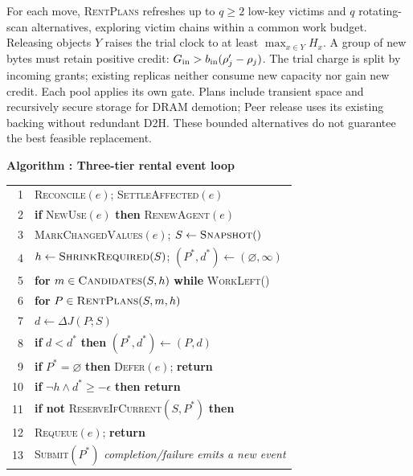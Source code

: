 For each move, \textsc{RentPlans} refreshes up to $q\ge2$ low-key victims
and $q$ rotating-scan alternatives, exploring victim chains within a common
work budget. Releasing objects $Y$ raises the trial clock to at least
$\max_{x\in Y}H_x$. A group of new bytes must retain positive credit:
$G_{\rm in}>b_{\rm in}(\rho'_j-\rho_j)$. The trial charge is split by
incoming grants; existing replicas neither consume new capacity nor gain
new credit. Each pool applies its own gate. Plans include transient space
and recursively secure storage for DRAM demotion; Peer release uses its
existing backing without redundant D2H. These bounded alternatives do
not guarantee the best feasible replacement.

\par\medskip\noindent\begin{minipage}{\columnwidth}
\raggedright
 \label{alg:placement}
 \textbf{Algorithm \thedesignalgorithm: Three-tier rental event loop}
 \par\smallskip
 \begin{tabularx}{\columnwidth}{@{}r@{\quad}X@{}}
 \toprule
 1 & \textsc{Reconcile}$(e)$; \textsc{SettleAffected}$(e)$ \\
 2 & \textbf{if} \textsc{NewUse}$(e)$ \textbf{then} \textsc{RenewAgent}$(e)$ \\
 3 & \textsc{MarkChangedValues}$(e)$; $S\gets\textsc{Snapshot}()$ \\
 4 & $h\gets\textsc{ShrinkRequired}(S)$; $(P^*,d^*)\gets(\varnothing,\infty)$ \\
 5 & \textbf{for} $m\in\textsc{Candidates}(S,h)$ \textbf{while} \textsc{WorkLeft}() \\
 6 & \quad \textbf{for} $P\in\textsc{RentPlans}(S,m,h)$ \\
 7 & \qquad $d\gets\Delta J(P;S)$ \\
 8 & \qquad \textbf{if} $d<d^*$ \textbf{then} $(P^*,d^*)\gets(P,d)$ \\
 9 & \textbf{if} $P^*=\varnothing$ \textbf{then} \textsc{Defer}$(e)$; \textbf{return} \\
 10 & \textbf{if} $\neg h\land d^*\ge-\epsilon$ \textbf{then return} \\
 11 & \textbf{if not} \textsc{ReserveIfCurrent}$(S,P^*)$ \textbf{then} \\
 12 & \quad \textsc{Requeue}$(e)$; \textbf{return} \\
 13 & \textsc{Submit}$(P^*)$ \quad\textit{completion/failure emits a new event} \\
 \bottomrule
 \end{tabularx}
\end{minipage}\par\medskip

